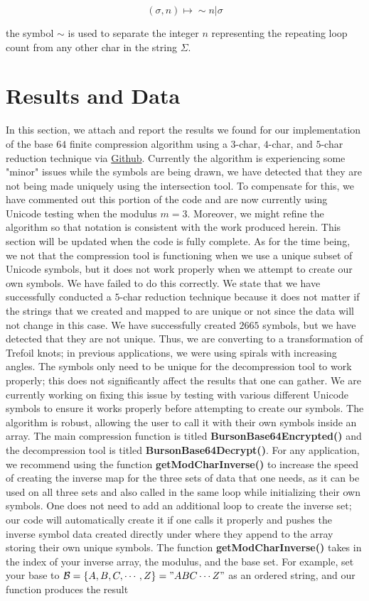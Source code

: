 \documentclass[amsmath,12pt,a4paper]{amsart}
\begin{document}
\begin{equation}\label{Eq53}
(\sigma,n) \mapsto \sim  n \vert \sigma
\end{equation}

the symbol $\sim$ is used to separate the integer $n$ representing the repeating loop count from any other char in the string $\Sigma$. 

\section{Results and Data}
In this section, we attach and report the results we found for our implementation of the base $64$ finite compression algorithm using a $3$-char, $4$-char, and $5$-char reduction technique via \textcolor{blue}{\href{https://github.com/bursonskullz/base64Compresssion}{Github}}. Currently the algorithm is experiencing some "minor" issues while the symbols are being drawn, we have detected that they are not being made uniquely using the intersection tool.  To compensate for this, we have commented out this portion of the code and are now currently using Unicode testing when the modulus $m = 3$. Moreover, we might refine the algorithm so that notation is consistent with the work produced herein. This section will be updated when the code is fully complete. As for the time being, we not that the compression tool is functioning when we use a unique subset of Unicode symbols, but it does not work properly when we attempt to create our own symbols. We have failed to do this correctly. We state that we have successfully conducted a $5$-char reduction technique because it does not matter if the strings that we created and mapped to are unique or not since the data will not change in this case. We have successfully created $2665$ symbols, but we have detected that they are not unique. Thus, we are converting to a transformation of Trefoil knots; in previous applications, we were using spirals with increasing angles. The symbols only need to be unique for the decompression tool to work properly; this does not significantly affect the results that one can gather. We are currently working on fixing this issue by testing with various different Unicode symbols to ensure it works properly before attempting to create our symbols. The algorithm is robust, allowing the user to call it with their own symbols inside an array. The main compression function is titled \textbf{BursonBase64Encrypted()} and the decompression tool is titled \textbf{BursonBase64Decrypt()}. For any application, we recommend using the function \textbf{getModCharInverse()} to increase the speed of creating the inverse map for the three sets of data that one needs, as it can be used  on all three sets and also called in the same loop while initializing their own symbols. One does not need to add an additional loop to create the inverse set; our code will automatically create it if one calls it properly and pushes the inverse symbol data created directly under where they append to the array storing their own unique symbols. The function \textbf{getModCharInverse()} takes in the index of your inverse array, the modulus, and the base set. For example, set your base to $\mathcal{B} = \{A,B,C, \cdots, Z\} = "ABC \cdots  Z"$ as an ordered string, and our function produces the result 
\end{document}
